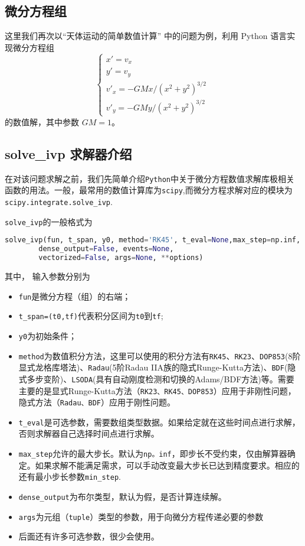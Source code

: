 \subsection{微分方程组}
这里我们再次以“天体运动的简单数值计算” 中的问题为例，利用 Python 语言实现微分方程组
\begin{equation}\label{eq_PyIVP_10}
\begin{cases}
x' = v_x\\
y' = v_y\\
v'_x = -GMx/(x^2 + y^2)^{3/2}\\
v'_y = -GMy/(x^2 + y^2)^{3/2}
\end{cases}~
\end{equation}
的数值解，其中参数 $GM=1$。
\subsection{solve\_ivp 求解器介绍}
在对该问题求解之前，我们先简单介绍\verb|Python|中关于微分方程数值求解库极相关函数的用法。一般，最常用的数值计算库为\verb|scipy|,而微分方程求解对应的模块为\verb|scipy.integrate.solve_ivp|.

 \verb|solve_ivp|的一般格式为
 \begin{lstlisting}[language=python]
 solve_ivp(fun, t_span, y0, method='RK45', t_eval=None,max_step=np.inf,
        dense_output=False, events=None, 
        vectorized=False, args=None, **options)
 \end{lstlisting}
 其中， 输入参数分别为
\begin{itemize}
\item \verb|fun|是微分方程（组）的右端；
\item  \verb|t_span=(t0,tf)|代表积分区间为\verb|t0|到\verb|tf|;
\item  \verb|y0|为初始条件；
\item \verb|method|为数值积分方法，这里可以使用的积分方法有\verb|RK45|、\verb|RK23|、\verb|DOP853|(8阶显式龙格库塔法)、\verb|Radau|(5阶Radau IIA族的隐式Runge-Kutta方法)、\verb|BDF|(隐式多步变阶)、\verb|LSODA|(具有自动刚度检测和切换的Adams/BDF方法)等。需要主要的是显式Runge-Kutta方法（\verb|RK23、RK45、DOP853|）应用于非刚性问题，隐式方法（\verb|Radau、BDF|）应用于刚性问题。
\item \verb|t_eval|是可选参数，需要数组类型数据。如果给定就在这些时间点进行求解，否则求解器自己选择时间点进行求解。
\item \verb|max_step|允许的最大步长。默认为\verb|np。inf|，即步长不受约束，仅由解算器确定。如果求解不能满足需求，可以手动改变最大步长已达到精度要求。相应的还有最小步长参数\verb|min_step|.
\item \verb|dense_output|为布尔类型，默认为假，是否计算连续解。
\item \verb|args|为元组（\verb|tuple|）类型的参数，用于向微分方程传递必要的参数
\item 后面还有许多可选参数，很少会使用。
\end{itemize}

